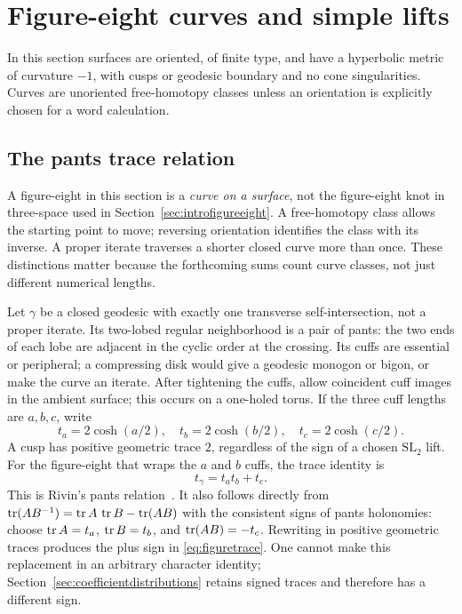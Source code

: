 \section{Figure-eight curves and simple lifts}
\label{sec:figures}

In this section surfaces are oriented, of finite type, and have a
hyperbolic metric of curvature $-1$, with cusps or geodesic boundary and
no cone singularities. Curves are unoriented free-homotopy classes unless
an orientation is explicitly chosen for a word calculation.

\subsection{The pants trace relation}

A figure-eight in this section is a \emph{curve on a surface},
not the figure-eight knot in three-space used in Section~\ref{sec:introfigureeight}.
A free-homotopy class allows the starting point to move; reversing
orientation identifies the class with its inverse. A proper iterate
traverses a shorter closed curve more than once. These distinctions
matter because the forthcoming sums count curve classes, not just
different numerical lengths.

Let $\gamma$ be a closed geodesic with exactly one transverse self-intersection,
not a proper iterate. Its two-lobed regular neighborhood is a pair of
pants: the two ends of each lobe are adjacent in the cyclic order at the
crossing. Its cuffs are essential or peripheral; a compressing disk would
give a geodesic monogon or bigon, or make the curve an iterate.
After tightening the cuffs, allow coincident cuff images in the ambient
surface; this occurs on a one-holed torus. If the three cuff lengths are $a,b,c$,
write
\[
 t_a=2\cosh(a/2),\quad t_b=2\cosh(b/2),\quad t_c=2\cosh(c/2).
\]
A cusp has positive geometric trace $2$, regardless of the sign of a
chosen $\mathrm{SL}_2$ lift. For the figure-eight that wraps the $a$
and $b$ cuffs, the trace identity is
\begin{equation}
 \boxed{t_\gamma=t_at_b+t_c.}
 \label{eq:figuretrace}
\end{equation}
This is Rivin's pants relation~\cite[Theorem 1.3]{RivinFigures}. It also
follows directly from
$\operatorname{tr}(AB^{-1})=\operatorname{tr} A\,\operatorname{tr} B-\operatorname{tr}(AB)$ with the consistent signs of pants
holonomies: choose $\operatorname{tr} A=t_a$, $\operatorname{tr} B=t_b$, and $\operatorname{tr}(AB)=-t_c$.
Rewriting in positive geometric traces produces the plus sign in
\eqref{eq:figuretrace}. One cannot make this replacement in an arbitrary
character identity; Section~\ref{sec:coefficientdistributions} retains
signed traces and therefore has a different sign.

